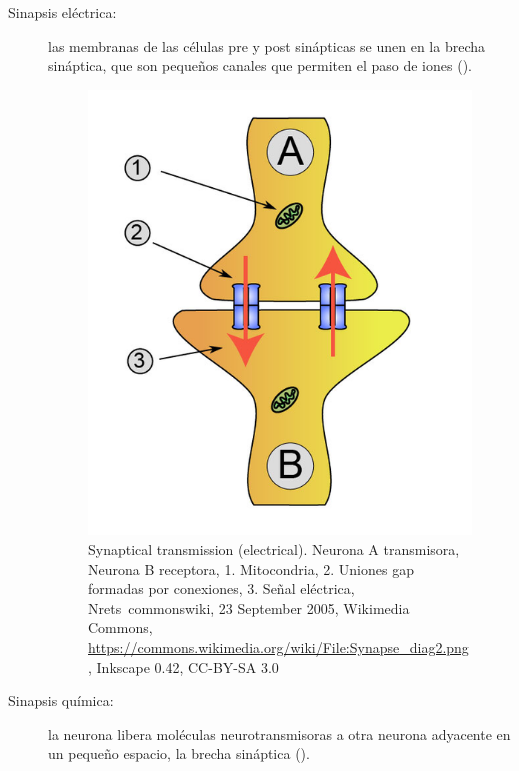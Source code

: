 \begin{description}
 \item [Sinapsis eléctrica:] las membranas de las células pre y post sinápticas se unen en la brecha sináptica, que son pequeños canales que permiten el paso de iones ().


\begin{figure}[h]
 \centering
 \includegraphics[scale=0.2]{../Figuras/sinapsisElectrica.png}
 \caption{Synaptical transmission (electrical). Neurona A transmisora, Neurona B receptora, 1. Mitocondria, 2. Uniones gap formadas por conexiones, 3. Señal eléctrica, Nrets~commonswiki, 23 September 2005, Wikimedia Commons, \url{https://commons.wikimedia.org/wiki/File:Synapse_diag2.png}, Inkscape 0.42, CC-BY-SA 3.0}
 \label{fig:sinapsisN}
\end{figure}
 
 \item [Sinapsis química:] la neurona libera moléculas neurotransmisoras a otra neurona adyacente en un pequeño espacio, la brecha sináptica ().



\end{description}
